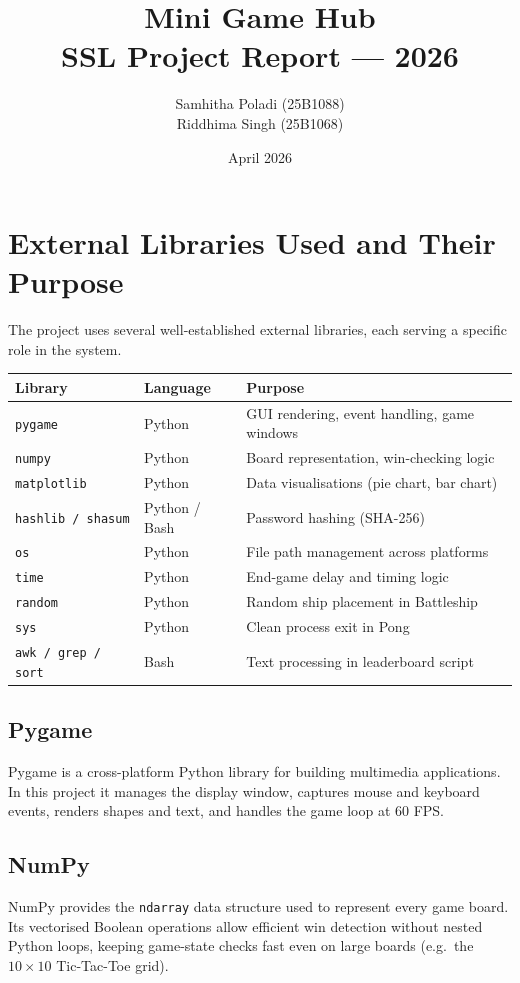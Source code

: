 \documentclass[12pt,a4paper]{article}
\title{Mini Game Hub \\ SSL Project Report --- 2026}
\author{Samhitha Poladi (25B1088) \\ Riddhima Singh (25B1068)}
\date{April 2026}
\begin{document}
\maketitle
\tableofcontents
\newpage

\section{External Libraries Used and Their Purpose}

The project uses several well-established external libraries, each serving a specific role in the system.

\begin{center}
\begin{tabular}{lll}
\toprule
\textbf{Library} & \textbf{Language} & \textbf{Purpose} \\
\midrule
\texttt{pygame}       & Python & GUI rendering, event handling, game windows \\
\texttt{numpy}        & Python & Board representation, win-checking logic \\
\texttt{matplotlib}   & Python & Data visualisations (pie chart, bar chart) \\
\texttt{hashlib / shasum} & Python / Bash & Password hashing (SHA-256) \\
\texttt{os}           & Python & File path management across platforms \\
\texttt{time}         & Python & End-game delay and timing logic \\
\texttt{random}       & Python & Random ship placement in Battleship \\
\texttt{sys}          & Python & Clean process exit in Pong \\
\texttt{awk / grep / sort} & Bash & Text processing in leaderboard script \\
\bottomrule
\end{tabular}
\end{center}

\subsection{Pygame}
Pygame is a cross-platform Python library for building multimedia applications. In this project
it manages the display window, captures mouse and keyboard events, renders shapes and text,
and handles the game loop at 60 FPS.

\subsection{NumPy}
NumPy provides the \texttt{ndarray} data structure used to represent every game board. Its
vectorised Boolean operations allow efficient win detection without nested Python loops, keeping
game-state checks fast even on large boards (e.g.\ the $10{\times}10$ Tic-Tac-Toe grid).
\end{document}
